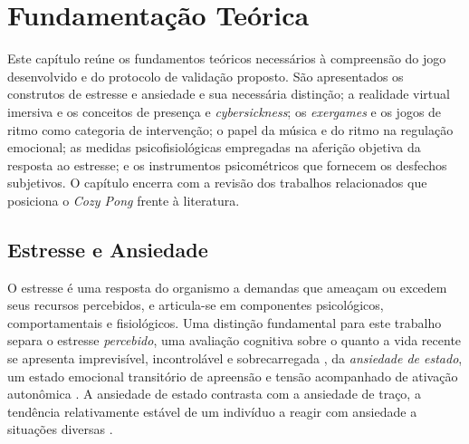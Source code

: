 \chapter{Fundamentação Teórica}\label{cap:fundamentacao}
\glsresetall


Este capítulo reúne os fundamentos teóricos necessários à compreensão do jogo desenvolvido e do protocolo de validação proposto. São apresentados os construtos de estresse e ansiedade e sua necessária distinção; a realidade virtual imersiva e os conceitos de presença e \textit{cybersickness}; os \textit{exergames} e os jogos de ritmo como categoria de intervenção; o papel da música e do ritmo na regulação emocional; as medidas psicofisiológicas empregadas na aferição objetiva da resposta ao estresse; e os instrumentos psicométricos que fornecem os desfechos subjetivos. O capítulo encerra com a revisão dos trabalhos relacionados que posiciona o \textit{Cozy Pong} frente à literatura.

\section{Estresse e Ansiedade}\label{sec:fund-estresse}

O estresse é uma resposta do organismo a demandas que ameaçam ou excedem seus recursos percebidos, e articula-se em componentes psicológicos, comportamentais e fisiológicos. Uma distinção fundamental para este trabalho separa o estresse \emph{percebido}, uma avaliação cognitiva sobre o quanto a vida recente se apresenta imprevisível, incontrolável e sobrecarregada \citep{Cohen1983}, da \emph{ansiedade de estado}, um estado emocional transitório de apreensão e tensão acompanhado de ativação autonômica \citep{Spielberger1983}. A ansiedade de estado contrasta com a ansiedade de traço, a tendência relativamente estável de um indivíduo a reagir com ansiedade a situações diversas \citep{Spielberger1983}.

